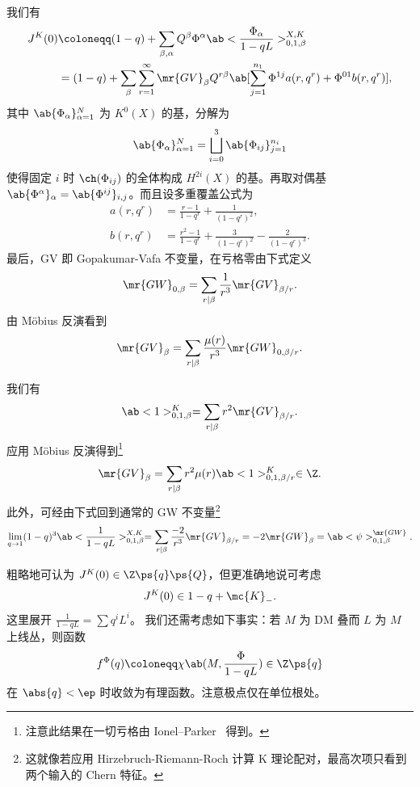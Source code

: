 \begin{thm}
    我们有
    \begin{align*}
        J^K(0) &\coloneqq (1-q) + \sum_{\beta, \alpha} Q^{\beta} \Phi^{\alpha} \ab<\frac{\Phi_{\alpha}}{1-qL}>_{0,1,\beta}^{X,K} \\
        &= (1-q) + \sum_{\beta} \sum_{r=1}^{\infty} \mr{GV}_{\beta} Q^{r\beta} \ab[\sum_{j=1}^{n_1} \Phi^{1j} a(r, q^r) + \Phi^{01} b(r, q^r)],
    \end{align*}
    其中 \(\ab\{\Phi_{\alpha}\}_{\alpha=1}^N\) 为 \(K^0(X)\) 的基，分解为
    \[ \ab\{\Phi_{\alpha}\}_{\alpha=1}^N = \bigsqcup_{i=0}^3 \ab\{\Phi_{ij}\}_{j=1}^{n_i} \]
    使得固定 \(i\) 时 \(\ch(\Phi_{ij})\) 的全体构成 \(H^{2i}(X)\) 的基。再取对偶基 \(\ab\{\Phi^{\alpha}\}_{\alpha} = \ab\{\Phi^{ij}\}_{i,j}\)。而且设多重覆盖公式为
    \begin{align*}
        a(r, q^r) &= \frac{r-1}{1-q^r} + \frac{1}{(1-q^r)^2}, \\
        b(r, q^r) &= \frac{r^2-1}{1-q^r} + \frac{3}{(1-q^r)^2} - \frac{2}{(1-q^r)^3}.
    \end{align*}
    最后，GV 即 Gopakumar-Vafa 不变量，在亏格零由下式定义
    \[ \mr{GW}_{0,\beta} = \sum_{r \mid \beta} \frac{1}{r^3} \mr{GV}_{\beta/r}. \]
    由 M\"obius 反演看到
    \[ \mr{GV}_{\beta} = \sum_{r \mid \beta} \frac{\mu(r)}{r^3} \mr{GW}_{0,\beta/r}. \]
\end{thm}

\begin{cor}
    我们有
    \[ \ab<1>_{0,1,\beta}^K = \sum_{r \mid \beta} r^2 \mr{GV}_{\beta/r}. \]
    应用 M\"obius 反演得到\footnote{注意此结果在一切亏格由 Ionel--Parker~\cite{IonelParker2018} 得到。}
    \[ \mr{GV}_{\beta} = \sum_{r \mid \beta} r^2 \mu(r) \ab<1>_{0,1,\beta/r}^K \in \Z. \]
    此外，可经由下式回到通常的 GW 不变量\footnote{这就像若应用 Hirzebruch-Riemann-Roch 计算 K 理论配对，最高次项只看到两个输入的 Chern 特征。}
    \[ \lim_{q \to 1} (1-q)^3 \ab<\frac{1}{1-qL}>_{0,1,\beta}^{X,K} = \sum_{r \mid \beta} \frac{-2}{r^3} \mr{GV}_{\beta/r} = -2 \mr{GW}_{\beta} = \ab<\psi>_{0,1,\beta}^{\mr{GW}}. \]
\end{cor}

粗略地可认为 \(J^K(0) \in \Z\ps{q}\ps{Q}\)，但更准确地说可考虑
\[ J^K(0) \in 1-q + \mc{K}_-. \]
这里展开 \(\frac{1}{1-qL} = \sum q^i L^i\)。
我们还需考虑如下事实：若 \(M\) 为 DM 叠而 \(L\) 为 \(M\) 上线丛，则函数
\[ f^{\Phi}(q) \coloneqq \chi\ab(M, \frac{\Phi}{1-qL}) \in \Z \ps{q} \]
在 \(\abs{q} < \ep\) 时收敛为有理函数。注意极点仅在单位根处。

